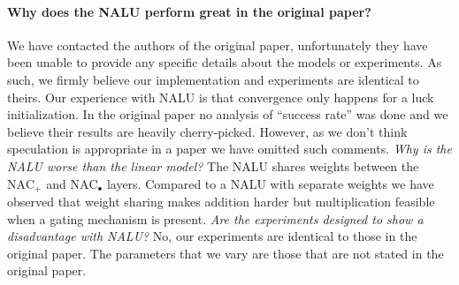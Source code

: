 \documentclass{article}
\begin{document}

\paragraph{Why does the NALU perform great in the original paper?} %
We have contacted the authors of the original paper, unfortunately they have been unable to provide any specific details about the models or experiments. As such, we firmly believe our implementation and experiments are identical to theirs. Our experience with NALU is that convergence only happens for a luck initialization. In the original paper no analysis of ``success rate'' was done and we believe their results are heavily cherry-picked. However, as we don't think speculation is appropriate in a paper we have omitted such comments. %
\textit{Why is the NALU worse than the linear model?} The NALU shares weights between the $\mathrm{NAC}_{+}$ and $\mathrm{NAC}_{\bullet}$ layers. Compared to a NALU with separate weights we have observed that weight sharing makes addition harder but multiplication feasible when a gating mechanism is present. %
\textit{Are the experiments designed to show a disadvantage with NALU?} No, our experiments are identical to those in the original paper. The parameters that we vary are those that are not stated in the original paper.
\end{document}
